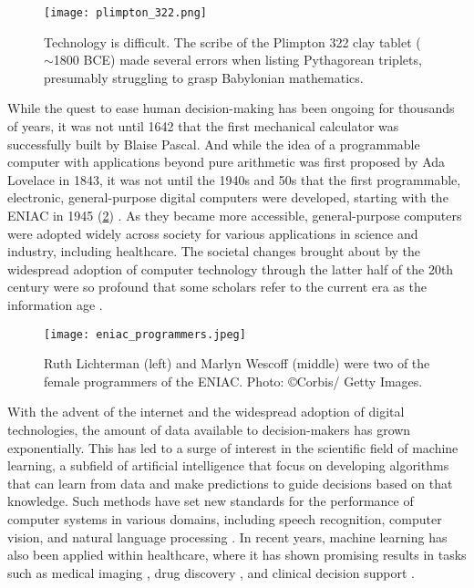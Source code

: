 \begin{figure}[t]
    \centering
    \texttt{[image: plimpton\_322.png]}
    \caption{Technology is difficult. The scribe of the Plimpton 322 clay tablet ($\sim$1800 BCE) made several errors when listing Pythagorean triplets, presumably struggling to grasp Babylonian mathematics.}
    \label{fig:plimpton_332}
\end{figure}

While the quest to ease human decision-making has been ongoing for thousands of years, it was not until 1642 that the first mechanical calculator was successfully built by Blaise Pascal. And while the idea of a programmable computer with applications beyond pure arithmetic was first proposed by Ada Lovelace in 1843, 
it was not until the 1940s and 50s that %
the first programmable, electronic, general-purpose digital computers were developed, starting with the ENIAC in 1945 (\cref{fig:eniac_programmers}) \cite{georges_universal_2001}. 
As they became more accessible, general-purpose computers were adopted widely across society for various applications in science and industry, including healthcare.
The societal changes brought about by the widespread adoption of computer technology through the latter half of the 20th century were so profound that some scholars refer to the current era as the information age \cite{georges_universal_2001, harari_sapiens_2011}.

\begin{figure}[t]
    \centering
    \texttt{[image: eniac\_programmers.jpeg]}
    \caption{Ruth Lichterman (left) and Marlyn Wescoff (middle) were two of the female programmers of the ENIAC. Photo: \copyright Corbis/ Getty Images.}
    \label{fig:eniac_programmers}
\end{figure}

With the advent of the internet and the widespread adoption of digital technologies, the amount of data available to decision-makers has grown exponentially. 
This has led to a surge of interest in the scientific field of machine learning, a subfield of artificial intelligence that focus on developing algorithms that can learn from data and make predictions to guide decisions based on that knowledge. 
Such methods have set new standards for the performance of computer systems in various domains, including speech recognition, computer vision, and natural language processing \cite{lecun_deep_2015}.
In recent years, machine learning has also been applied within healthcare, where it has shown promising results in tasks such as medical imaging \cite{lundervold_overview_2019}, drug discovery \cite{chen_rise_2018}, and clinical decision support \cite{cite15, cite14}.

